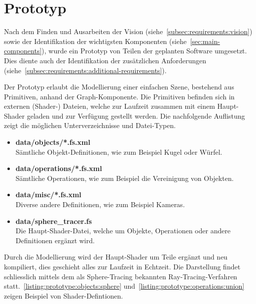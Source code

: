 
\chapter{Prototyp}
\label{chap:prototype}

Nach dem Finden und Ausarbeiten der Vision
(siehe~\autoref{subsec:requirements:vision}) sowie der Identifikation der
wichtigsten Komponenten (siehe~\autoref{sec:main-components}), wurde ein
Prototyp von Teilen der geplanten Software umgesetzt. Dies diente auch der
Identifikation der zusätzlichen Anforderungen
(siehe~\autoref{subsec:requirements:additional-requirements}).

Der Prototyp erlaubt die Modellierung einer einfachen Szene, bestehend aus
Primitiven, anhand der Graph-Komponente. Die Primitiven befinden sich in
externen (Shader-) Dateien, welche zur Laufzeit zusammen mit einem Haupt-Shader
geladen und zur Verfügung gestellt werden. Die nachfolgende Auflistung zeigt
die möglichen Unterverzeichnisse und Datei-Typen.

\begin{itemize}
    \item \textbf{data/objects/*.fs.xml}\\
        Sämtliche Objekt-Definitionen, wie zum Beispiel Kugel oder Würfel.
    \item \textbf{data/operations/*.fs.xml}\\
        Sämtliche Operationen, wie zum Beispiel die Vereinigung von Objekten.
    \item \textbf{data/misc/*.fs.xml}\\
        Diverse andere Definitionen, wie zum Beispiel Kameras.
    \item \textbf{data/sphere\_tracer.fs}\\
        Die Haupt-Shader-Datei, welche um Objekte, Operationen oder andere
        Definitionen ergänzt wird.
\end{itemize}

Durch die Modellierung wird der Haupt-Shader um Teile ergänzt und neu kompiliert, dies geschieht alles zur
Laufzeit in Echtzeit. Die Darstellung findet schliesslich mittels dem als
Sphere-Tracing bekannten Ray-Tracing-Verfahren
statt.~\autoref{listing:prototype:objects:sphere}
und~\autoref{listing:prototype:operations:union} zeigen Beispiel von
Shader-Defintionen.

